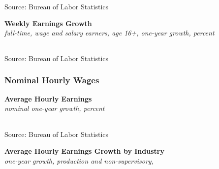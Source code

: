 \documentclass{report}
\makeatletter
\newcommand{\tbllink}[1]{\href{https://raw.githubusercontent.com/bdecon/US-chartbook/master/chartbook/data/#1}{\faTable}}
\newcommand*\short[1]{\expandafter\@gobbletwo\number\numexpr#1\relax}
\newcommand{\dateaxisticks}{
		date coordinates in=x, axis line style={draw=none},
		xmax={2021-05-15},
		max space between ticks=40,	    
		xtick={{1990-01-01}, {1992-01-01}, {1994-01-01}, 
			{1996-01-01}, {1998-01-01}, {2000-01-01}, 
			{2002-01-01}, {2004-01-01}, {2006-01-01},
			{2008-01-01}, {2010-01-01}, {2012-01-01}, {2014-01-01},
		    {2016-01-01}, {2018-01-01}, {2020-01-01}},
		minor xtick={{1989-01-01}, {1991-01-01}, {1993-01-01},
			{1995-01-01}, {1997-01-01}, {1999-01-01}, 
			{2001-01-01}, {2003-01-01}, {2005-01-01}, {2007-01-01},
		    {2009-01-01}, {2011-01-01}, {2013-01-01}, {2015-01-01},
		    {2017-01-01}, {2019-01-01}, {2021-01-01}},
		enlarge y limits={0.06}, enlarge x limits={0.01},
		}
\newcommand{\bbar}[2]{extra #1 ticks = {{#2}}, extra #1 tick labels = ,
		extra #1 tick style = {grid=major, grid style={thick, black!25}},}
\newcommand{\stdline}[4]{\addplot[very thick, no markers, color=#1] 
		table [x=#2, y=#3, col sep=comma] {#4};	}
\newcommand{\thickline}[4]{\addplot[ultra thick, no markers, color=#1] 
		table [x=#2, y=#3, col sep=comma] {#4};	}
\newcommand{\rbars}{
		\fill[color=black!10] (axis cs:{1990-07-01},\pgfkeysvalueof{/pgfplots/ymin}) rectangle 
			(axis cs:{1991-03-01}, \pgfkeysvalueof{/pgfplots/ymax});
		\fill[color=black!10] (axis cs:{2007-12-01},\pgfkeysvalueof{/pgfplots/ymin}) rectangle 
			(axis cs:{2009-07-01}, \pgfkeysvalueof{/pgfplots/ymax});
		\fill[color=black!10] (axis cs:{2001-03-01},\pgfkeysvalueof{/pgfplots/ymin}) rectangle 
			(axis cs:{2001-11-01}, \pgfkeysvalueof{/pgfplots/ymax});
		\fill[color=black!10] (axis cs:{2020-02-01},\pgfkeysvalueof{/pgfplots/ymin}) rectangle 
			(axis cs:{2021-05-15}, \pgfkeysvalueof{/pgfplots/ymax});}
\makeatother
\begin{document}
{{\begin{minipage}{0.76\textwidth}
\footnotesize{Source: Bureau of Labor Statistics}
\vspace{4mm}

\normalsize \textbf{Weekly Earnings Growth}\\
\footnotesize{\textit{full-time, wage and salary earners, age 16+, one-year growth, percent}}\\
 \setlength{\tabcolsep}{3.1pt} \color{black!90}
	{\renewcommand{\arraystretch}{1.55}
		\begin{tabular}{p{19mm} R{8.8mm} R{8.8mm} R{8.8mm} R{8.8mm} R{8.8mm} R{8.8mm} 
		   R{8.8mm} R{8.8mm} R{8.8mm} R{8.8mm}}
			  \hline
		\end{tabular}}\vspace{-2mm}
				
\footnotesize{Source: Bureau of Labor Statistics}
\end{minipage}
\newpage
\subsubsection*{\color{black!70} \seriffont Nominal Hourly Wages}
\begin{minipage}{0.76\textwidth}
\small 
\vspace{2mm}

\normalsize \textbf{Average Hourly Earnings}\\
\footnotesize{\textit{nominal one-year growth, percent}}\\
\hspace*{-2mm} \\
\footnotesize{Source: Bureau of Labor Statistics} \hfill \tbllink{ahe.csv}
\vspace{3mm}

\small  
\vspace{3mm}

\normalsize \textbf{Average Hourly Earnings Growth by Industry}\\
\footnotesize{\textit{one-year growth, production and non-supervisory, }}\\

\end{minipage}
\newpage
\begin{minipage}{0.76\textwidth}

\end{minipage}}}
\end{document}
